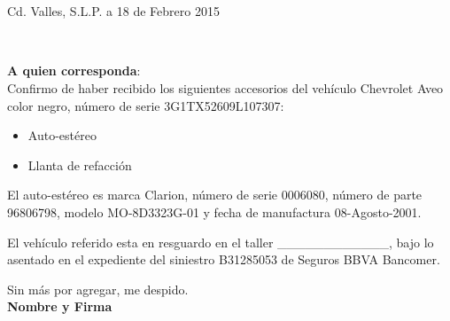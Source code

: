 \documentclass[11pt]{article}
\def\firstname{Jaime Jesús}
\def\familyname{Delgado Meraz}
\def\FileAuthor{\firstname~\familyname}
\begin{document}
\sffamily   %
\hfill%
\begin{minipage}[t]{.6\textwidth}
\raggedleft%
~\\[.35ex]
\small\itshape%
\end{minipage}\\[1em]
%
\begin{minipage}[t]{.4\textwidth}
\end{minipage}
\hfill %
\begin{minipage}[t]{.5\textwidth}
\raggedleft %
Cd. Valles, S.L.P. a 18 de Febrero 2015
\end{minipage}\\[2em]
\raggedright
\textbf{A quien corresponda}:\\[1.5em]

Confirmo de haber recibido los siguientes accesorios del vehículo Chevrolet Aveo color negro, número de serie 3G1TX52609L107307:
\begin{itemize}
  \item Auto-estéreo
  \item Llanta de refacción
\end{itemize}

El auto-estéreo es marca Clarion, número de serie 0006080, número de parte 96806798, modelo MO-8D3323G-01 y fecha de manufactura 08-Agosto-2001.

El vehículo referido esta en resguardo en el taller \_\_\_\_\_\_\_\_\_\_\_\_, bajo lo asentado en el expediente del siniestro B31285053 de Seguros BBVA Bancomer.

Sin más por agregar, me despido.\\[7em]
%
{\bfseries Nombre y Firma}\\
%
\vfill%
\end{document}
